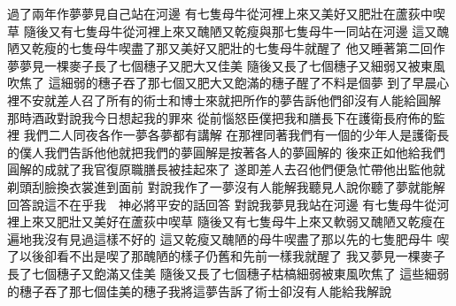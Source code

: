 \bchapter%
過了兩年作夢\yuentien 夢見自己站在河邊\chuan 
{}有七隻母牛從河裡上來\chientien 又美好\chientien 又肥壯在蘆荻中喫草\chuan 
{}隨後又有七隻母牛從河裡上來\chientien 又醜陋\chientien 又乾瘦\chientien 與那七隻母牛一同站在河邊\chuan 
{}這又醜陋\chientien 又乾瘦的七隻母牛\chientien 喫盡了那又美好\chientien 又肥壯的七隻母牛\yuentien{}就醒了\chuan 
{}他又睡著\chientien 第二回作夢\yuentien 夢見一棵麥子長了七個穗子\chientien 又肥大\chientien 又佳美\chuan 
{}隨後又長了七個穗子\chientien 又細弱\chientien 又被東風吹焦了\chuan 
{}這細弱的穗子\chientien 吞了那七個又肥大又飽滿的穗子\yuentien{}醒了\chientien 不料是個夢\chuan 
{}到了早晨\chientien{}心裡不安\chientien 就差人召了所有的術士和博士來\yuentien{}就把所作的夢告訴他們\chientien 卻沒有人能給圓解\chuan\Chuan
{}那時酒政對說\chientien 我今日想起我的罪來\yuentien 
{}從前惱怒臣僕\chientien 把我和膳長下在護衛長府佈的監裡\chuan 
{}我們二人同夜各作一夢\chientien 各夢都有講解\chuan 
{}在那裡同著我們有一個的少年人\chientien 是護衛長的僕人\chientien 我們告訴他\chientien 他就把我們的夢圓解\chientien 是按著各人的夢圓解的\chuan 
{}後來正如他給我們圓解的成就了\yuentien 我官復原職\chientien 膳長被挂起來了\chuan\Chuan
{}遂即差人去召\yuentien 他們便急忙帶他出監\chientien 他就剃頭\chientien 刮臉\chientien 換衣裳\chientien 進到面前\chuan 
{}對說\chientien 我作了一夢沒有人能解\chientien 我聽見人說\chientien 你聽了夢就能解\chuan 
{}回答說\chientien 這不在乎我\chientien 　神必將平安的話回答\chuan 
{}對說\chientien 我夢見我站在河邊\yuentien 
{}有七隻母牛從河裡上來\chientien 又肥壯\chientien 又美好\chientien 在蘆荻中喫草\chuan 
{}隨後又有七隻母牛上來\chientien 又軟弱\chientien 又醜陋\chientien 又乾瘦\chientien 在遍地\chientien 我沒有見過這樣不好的\chuan 
{}這又乾瘦\chientien 又醜陋的母牛\chientien 喫盡了那以先的七隻肥母牛\chuan 
{}喫了以後\chientien 卻看不出是喫了\chientien 那醜陋的樣子仍舊和先前一樣\yuentien 我就醒了\chuan 
{}我又夢見一棵麥子\chientien 長了七個穗子\chientien 又飽滿\chientien 又佳美\yuentien 
{}隨後又長了七個穗子\chientien 枯槁細弱\chientien 被東風吹焦了\chuan 
{}這些細弱的穗子\chientien 吞了那七個佳美的穗子\yuentien 我將這夢告訴了術士\chientien 卻沒有人能給我解說\chuan\Chuan
